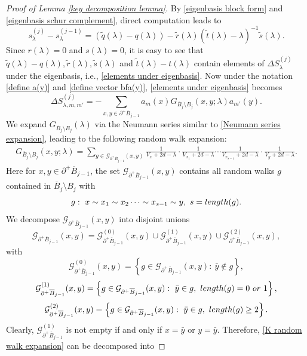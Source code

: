 \documentclass[10pt,a4paper]{amsart}
\newcommand{\barB}{\overline{B}}
\newcommand{\diffSj}{\Delta {S}^{(j)}}
\newcommand{\length}{{\rm length}}
\newcommand{\mcG}{\mathcal{G}}
\newcommand{\smallSjminusone}{s^{(j-1)}}
\newcommand{\smallSj}{s^{(j)}}
\newcommand{\tq}{\tilde{q}}
\newcommand{\tr}{\tilde{r}}
\newcommand{\ts}{\tilde{s}}
\renewcommand{\tt}{\tilde{t}}
\begin{document}
\begin{proof}[Proof of Lemma \ref{key decomposition lemma}]
 \noindent By \eqref{eigenbasis block form} and \eqref{eigenbasis schur complement}, direct computation leads to 
\begin{equation}\label{baby decomposition}
  \smallSj_{\lambda}-\smallSjminusone_\lambda =(\tilde{q}(\lambda)-q(\lambda))- \tilde{r}(\lambda)(\tilde{t}(\lambda)-\lambda)^{-1}\tilde{s}(\lambda).
\end{equation}
Since $r(\lambda)=0$ and $s(\lambda)=0$, it is easy to see that  $\tq(\lambda)-q(\lambda),\tr(\lambda),\ts(\lambda)$ and $\tt(\lambda)-t(\lambda)$ contain elements of $\diffSj_{\lambda}$ under the eigenbasis, i.e.,  \eqref{elements under eigenbasis}.
Now under the notation \eqref{define a(y)} and \eqref{define vector bfa(y)}, \eqref{elements under eigenbasis} becomes
\begin{equation}\label{elements in bfa}
    \diffSj_{\lambda,m,m'}=-\sum_{x,y\in \partial^+ \barB_{j-1}}a_{m}(x)G_{\barB_j\setminus B_j }(x,y;\lambda) a_{m'}(y).
\end{equation}
We expand $G_{\barB_{j}\setminus B_j}(\lambda)$ via the Neumann series similar to  \eqref{Neumann series expansion}, leading to the following random walk expansion:
\begin{align}\label{K random walk expansion}
  G_{\barB_{j}\setminus B_j}(x,y;\lambda) =\sum_{g\in \mcG_{\partial^+ \barB_{j-1}}(x,y)}  \frac{1}{V_{x}+2d-\lambda}\cdot \frac{1}{V_{x_1}+2d-\lambda}\cdots \frac{1}{V_{x_{s-1}}+2d-\lambda}\cdot \frac{1}{V_{y}+2d-\lambda}.
\end{align}
Here for $x,y\in \partial^+ \barB_{j-1}$, the set $\mcG_{\partial^+ \barB_{j-1}}(x,y)$ contains all random walks  $g$ contained in $\barB_{j}\setminus B_j$ with 
\[g:\ x\sim x_1\sim x_2\cdots \sim x_{s-1}\sim y,\ s=\length(g) .\]
We decompose $\mcG_{\partial^+ \barB_{j-1}}(x,y)$ into disjoint unions 
\[\mcG_{\partial^+ \barB_{j-1}}(x,y) =\mcG_{\partial^+ \barB_{j-1}}^{(0)} (x,y)\cup \mcG_{\partial^+ \barB_{j-1}}^{(1)} (x,y)\cup \mcG_{\partial^+ \barB_{j-1}}^{(2)} (x,y) ,\]
with
\[\mcG_{\partial^+ \barB_{j-1}}^{(0)} (x,y)= \left\{ g\in \mcG_{\partial^+ \barB_{j-1}} (x,y) :\  \bar{y}\notin g \right\},\]
\[\mcG_{\partial^+ \barB_{j-1}}^{(1)} (x,y)= \left\{ g\in \mcG_{\partial^+ \barB_{j-1}} (x,y) : \ \bar{y}\in g ,\ \length(g)=0 \ {\rm or} \ 1 \right\},\]
\[\mcG_{\partial^+ \barB_{j-1}}^{(2)} (x,y)= \left\{ g\in \mcG_{\partial^+ \barB_{j-1}} (x,y) : \ \bar{y}\in g ,\ \length(g)\geq 2 \right\}.\]
Clearly, $\mcG_{\partial^+ \barB_{j-1}}^{(1)}$ is not empty if and only if $x=\bar{y}$ or $y=\bar{y}$. Therefore, \eqref{K random walk expansion} can be decomposed into 

\end{proof}
\end{document}
